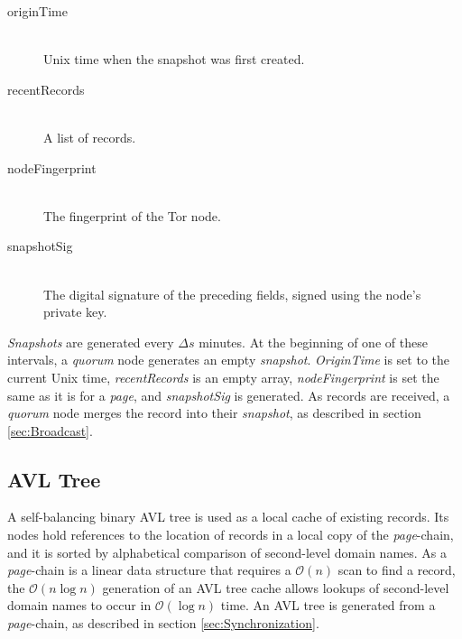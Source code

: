 \begin{description}
	\item[originTime] \hfill \\
		Unix time when the snapshot was first created.
	\item[recentRecords] \hfill \\
		A list of records.
	\item[nodeFingerprint] \hfill \\
		The fingerprint of the Tor node.
	\item[snapshotSig] \hfill \\
		The digital signature of the preceding fields, signed using the node's private key.
\end{description}

\emph{Snapshots} are generated every $ \Delta s $ minutes. At the beginning of one of these intervals, a \emph{quorum} node generates an empty \emph{snapshot}. \emph{OriginTime} is set to the current Unix time, \emph{recentRecords} is an empty array, \emph{nodeFingerprint} is set the same as it is for a \emph{page}, and \emph{snapshotSig} is generated. As records are received, a \emph{quorum} node merges the record into their \emph{snapshot}, as described in section \ref{sec:Broadcast}.

\subsection{AVL Tree}
\label{sec:AVLTree}

A self-balancing binary AVL tree is used as a local cache of existing records. Its nodes hold references to the location of records in a local copy of the \emph{page}-chain, and it is sorted by alphabetical comparison of second-level domain names. As a \emph{page}-chain is a linear data structure that requires a $ \mathcal{O}(n) $ scan to find a record, the $ \mathcal{O}(n\log{}n) $ generation of an AVL tree cache allows lookups of second-level domain names to occur in $ \mathcal{O}(\log{}n) $ time. An AVL tree is generated from a \emph{page}-chain, as described in section \ref{sec:Synchronization}.





